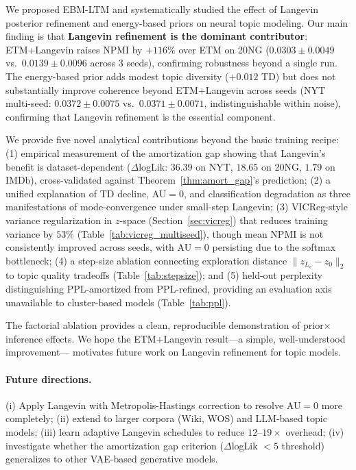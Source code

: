 \documentclass[10pt]{article}
\begin{document}
We proposed EBM-LTM and systematically studied the effect of Langevin posterior
refinement and energy-based priors on neural topic modeling.
Our main finding is that \textbf{Langevin refinement is the dominant contributor}:
ETM+Langevin raises NPMI by $+116\%$ over ETM on 20NG ($0.0303\pm0.0049$ vs.\
$0.0139\pm0.0096$ across 3 seeds), confirming robustness beyond a single run.
The energy-based prior adds modest topic diversity ($+0.012$ TD) but does not
substantially improve coherence beyond ETM+Langevin across seeds
(NYT multi-seed: $0.0372\pm0.0075$ vs.\ $0.0371\pm0.0071$, indistinguishable within noise),
confirming that Langevin refinement is the essential component.

We provide five novel analytical contributions beyond the basic training recipe:
(1) empirical measurement of the amortization gap showing that Langevin's benefit is
dataset-dependent ($\Delta$logLik: $36.39$ on NYT, $18.65$ on 20NG, $1.79$ on IMDb),
cross-validated against Theorem~\ref{thm:amort_gap}'s prediction;
(2) a unified explanation of TD decline, AU$=0$, and classification degradation
as three manifestations of mode-convergence under small-step Langevin;
(3) VICReg-style variance regularization in $z$-space (Section~\ref{sec:vicreg})
that reduces training variance by $53\%$ (Table~\ref{tab:vicreg_multiseed}), though mean NPMI
is not consistently improved across seeds, with AU$=0$ persisting due to the softmax bottleneck;
(4) a step-size ablation connecting exploration distance $\|z_{L_v}-z_0\|_2$ to
topic quality tradeoffs (Table~\ref{tab:stepsize}); and
(5) held-out perplexity distinguishing PPL-amortized from PPL-refined, providing
an evaluation axis unavailable to cluster-based models (Table~\ref{tab:ppl}).

The factorial ablation provides a clean, reproducible demonstration of prior$\times$inference
effects. We hope the ETM+Langevin result---a simple, well-understood improvement---
motivates future work on Langevin refinement for topic models.

\paragraph{Future directions.}
(i) Apply Langevin with Metropolis-Hastings correction to resolve AU$=0$ more completely;
(ii) extend to larger corpora (Wiki, WOS) and LLM-based topic models;
(iii) learn adaptive Langevin schedules to reduce $12$--$19\times$ overhead;
(iv) investigate whether the amortization gap criterion ($\Delta$logLik $< 5$ threshold)
generalizes to other VAE-based generative models.
\end{document}
